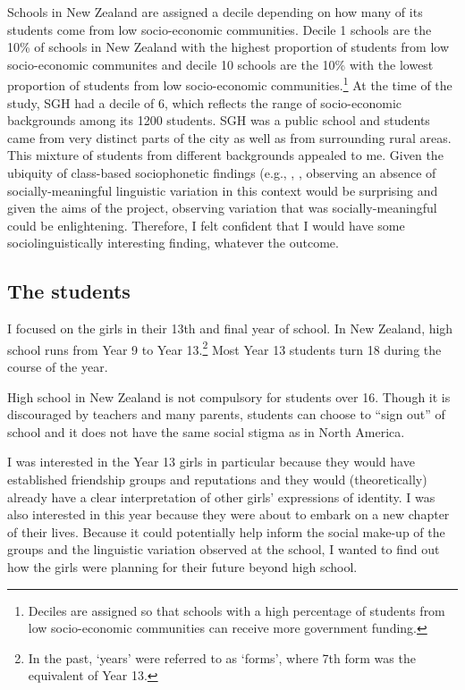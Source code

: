 Schools in New Zealand are assigned a decile depending on how many of its students come from low socio-economic communities. Decile 1 schools are the 10\% of schools in New Zealand with the highest proportion of students from low socio-economic communites and decile 10 schools are the 10\% with the lowest proportion of students from low socio-economic communities.\footnote{Deciles are assigned so that schools with a high percentage of students from low socio-economic communities can receive more government funding.} At the time of the study, SGH had a decile of 6, which reflects the range of socio-economic backgrounds among its 1200 students. SGH was a public school and students came from very distinct parts of the city as well as from surrounding rural areas. This mixture of students from different backgrounds appealed to me. Given the ubiquity of class-based sociophonetic findings (e.g., \citet{labov1966}, \citet{trudgill1972}, observing an absence of socially-meaningful linguistic variation in this context would be surprising and given the aims of the project, observing variation that was socially-meaningful could be enlightening. Therefore, I felt confident that I would have some sociolinguistically interesting finding, whatever the outcome. \nocite{labov1966} \nocite{trudgill1972}


\subsection{The students}
I focused on the girls in their 13th and final year of school. In New Zealand, high school runs from Year 9 to Year 13.\footnote{In the past, `years' were referred to as `forms', where 7th form was the equivalent of Year 13.}  Most Year 13 students turn 18 during the course of the year. 

High school in New Zealand is not compulsory for students over 16. Though it is discouraged by teachers and many parents, students can choose to ``sign out'' of school and it does not have the same social stigma as in North America. 

I was interested in the Year 13 girls in particular because they would have established friendship groups and reputations and they would (theoretically) already have a clear interpretation of other girls' expressions of identity. I was also interested in this year because they were about to embark on a new chapter of their lives. Because it could potentially help inform the social make-up of the groups and the linguistic variation observed at the school, I wanted to find out how the girls were planning for their future beyond high school.


